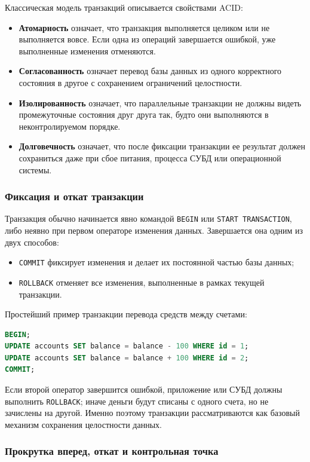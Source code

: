 Классическая модель транзакций описывается свойствами ACID:
\begin{itemize}
    \item \textbf{Атомарность} означает, что транзакция выполняется целиком или не выполняется вовсе. Если одна из операций завершается ошибкой, уже выполненные изменения отменяются.
    \item \textbf{Согласованность} означает перевод базы данных из одного корректного состояния в другое с сохранением ограничений целостности.
    \item \textbf{Изолированность} означает, что параллельные транзакции не должны видеть промежуточные состояния друг друга так, будто они выполняются в неконтролируемом порядке.
    \item \textbf{Долговечность} означает, что после фиксации транзакции ее результат должен сохраниться даже при сбое питания, процесса СУБД или операционной системы.
\end{itemize}

\subsubsection{Фиксация и откат транзакции}

Транзакция обычно начинается явно командой \texttt{BEGIN} или \texttt{START TRANSACTION}, либо неявно при первом операторе изменения данных. Завершается она одним из двух способов:
\begin{itemize}
    \item \texttt{COMMIT} фиксирует изменения и делает их постоянной частью базы данных;
    \item \texttt{ROLLBACK} отменяет все изменения, выполненные в рамках текущей транзакции.
\end{itemize}

Простейший пример транзакции перевода средств между счетами:
\begin{lstlisting}[language=SQL]
BEGIN;
UPDATE accounts SET balance = balance - 100 WHERE id = 1;
UPDATE accounts SET balance = balance + 100 WHERE id = 2;
COMMIT;
\end{lstlisting}

Если второй оператор завершится ошибкой, приложение или СУБД должны выполнить \texttt{ROLLBACK}; иначе деньги будут списаны с одного счета, но не зачислены на другой. Именно поэтому транзакции рассматриваются как базовый механизм сохранения целостности данных.

\subsubsection{Прокрутка вперед, откат и контрольная точка}

